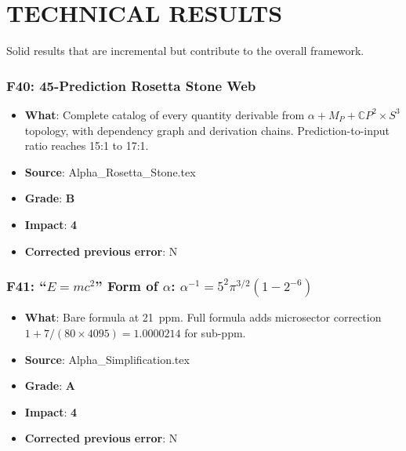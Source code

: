 \documentclass[11pt,a4paper]{article}
\newcommand{\grade}[1]{\textbf{#1}}
\newcommand{\impact}[1]{\textbf{#1}}
\begin{document}
\part{TECHNICAL RESULTS}
\label{part:technical}

Solid results that are incremental but contribute to the overall framework.

\section{F40: 45-Prediction Rosetta Stone Web}
\begin{itemize}[nosep]
\item \textbf{What}: Complete catalog of every quantity derivable from $\alpha + M_P + \mathbb{C}P^2 \times S^3$ topology, with dependency graph and derivation chains. Prediction-to-input ratio reaches 15:1 to 17:1.
\item \textbf{Source}: Alpha\_Rosetta\_Stone.tex
\item \textbf{Grade}: \grade{B}
\item \textbf{Impact}: \impact{4}
\item \textbf{Corrected previous error}: N
\end{itemize}

\section{F41: ``$E = mc^2$'' Form of $\alpha$: $\alpha^{-1} = 5^2 \pi^{3/2} (1-2^{-6})$}
\begin{itemize}[nosep]
\item \textbf{What}: Bare formula at 21~ppm. Full formula adds microsector correction $1 + 7/(80 \times 4095) = 1.0000214$ for sub-ppm.
\item \textbf{Source}: Alpha\_Simplification.tex
\item \textbf{Grade}: \grade{A}
\item \textbf{Impact}: \impact{4}
\item \textbf{Corrected previous error}: N
\end{itemize}
\end{document}
